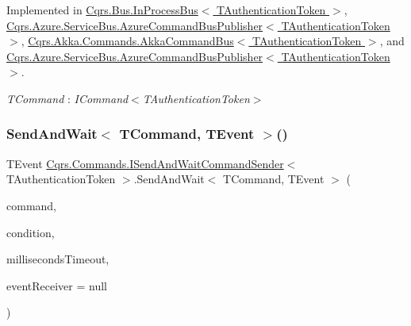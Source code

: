 Implemented in \hyperlink{classCqrs_1_1Bus_1_1InProcessBus_ac8c4a77edc761f15e16c638624424443_ac8c4a77edc761f15e16c638624424443}{Cqrs.\+Bus.\+In\+Process\+Bus$<$ T\+Authentication\+Token $>$}, \hyperlink{classCqrs_1_1Azure_1_1ServiceBus_1_1AzureCommandBusPublisher_aa04a7f8ad0bc192d1e8d2cfce09d1290_aa04a7f8ad0bc192d1e8d2cfce09d1290}{Cqrs.\+Azure.\+Service\+Bus.\+Azure\+Command\+Bus\+Publisher$<$ T\+Authentication\+Token $>$}, \hyperlink{classCqrs_1_1Akka_1_1Commands_1_1AkkaCommandBus_a80fe44ab4ef2dc64260f2e27a673b91c_a80fe44ab4ef2dc64260f2e27a673b91c}{Cqrs.\+Akka.\+Commands.\+Akka\+Command\+Bus$<$ T\+Authentication\+Token $>$}, and \hyperlink{classCqrs_1_1Azure_1_1ServiceBus_1_1AzureCommandBusPublisher_aa04a7f8ad0bc192d1e8d2cfce09d1290_aa04a7f8ad0bc192d1e8d2cfce09d1290}{Cqrs.\+Azure.\+Service\+Bus.\+Azure\+Command\+Bus\+Publisher$<$ T\+Authentication\+Token $>$}.

\begin{Desc}
\item[Type Constraints]\begin{description}
\item[{\em T\+Command} : {\em I\+Command$<$T\+Authentication\+Token$>$}]\end{description}
\end{Desc}
\mbox{\label{interfaceCqrs_1_1Commands_1_1ISendAndWaitCommandSender_a230c249fa137eafc9857c3b73ae86fcd_a230c249fa137eafc9857c3b73ae86fcd}} 
\subsubsection{\texorpdfstring{Send\+And\+Wait$<$ T\+Command, T\+Event $>$()}{SendAndWait< TCommand, TEvent >()}\hspace{0.1cm}{\footnotesize\ttfamily [5/6]}}
{\footnotesize\ttfamily T\+Event \hyperlink{interfaceCqrs_1_1Commands_1_1ISendAndWaitCommandSender}{Cqrs.\+Commands.\+I\+Send\+And\+Wait\+Command\+Sender}$<$ T\+Authentication\+Token $>$.Send\+And\+Wait$<$ T\+Command, T\+Event $>$ (\begin{DoxyParamCaption}\item[{T\+Command}]{command,  }\item[{Func$<$ I\+Enumerable$<$ \hyperlink{interfaceCqrs_1_1Events_1_1IEvent}{I\+Event}$<$ T\+Authentication\+Token $>$$>$, T\+Event $>$}]{condition,  }\item[{int}]{milliseconds\+Timeout,  }\item[{\hyperlink{interfaceCqrs_1_1Events_1_1IEventReceiver}{I\+Event\+Receiver}$<$ T\+Authentication\+Token $>$}]{event\+Receiver = {\ttfamily null} }\end{DoxyParamCaption})}



